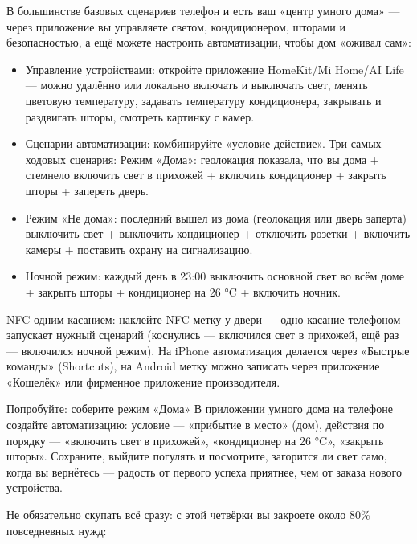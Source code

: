 
В большинстве базовых сценариев телефон и есть ваш «центр умного дома» — через приложение вы управляете светом, кондиционером, шторами и безопасностью, а ещё можете настроить автоматизации, чтобы дом «оживал сам»:

\begin{itemize}
  \item Управление устройствами: откройте приложение HomeKit/Mi Home/AI Life — можно удалённо или локально включать и выключать свет, менять цветовую температуру, задавать температуру кондиционера, закрывать и раздвигать шторы, смотреть картинку с камер.
  \item Сценарии автоматизации: комбинируйте «условие действие». Три самых ходовых сценария: Режим «Дома»: геолокация показала, что вы дома + стемнело включить свет в прихожей + включить кондиционер + закрыть шторы + запереть дверь.
  \item Режим «Не дома»: последний вышел из дома (геолокация или дверь заперта) выключить свет + выключить кондиционер + отключить розетки + включить камеры + поставить охрану на сигнализацию.
  \item Ночной режим: каждый день в 23:00 выключить основной свет во всём доме + закрыть шторы + кондиционер на 26 °C + включить ночник.
\end{itemize}

NFC одним касанием: наклейте NFC-метку у двери — одно касание телефоном запускает нужный сценарий (коснулись — включился свет в прихожей, ещё раз — включился ночной режим). На iPhone автоматизация делается через «Быстрые команды» (Shortcuts), на Android метку можно записать через приложение «Кошелёк» или фирменное приложение производителя.

\begin{tcbpractice}{Попробуйте: соберите режим «Дома»}
В приложении умного дома на телефоне создайте автоматизацию: условие — «прибытие в место» (дом), действия по порядку — «включить свет в прихожей», «кондиционер на 26 °C», «закрыть шторы». Сохраните, выйдите погулять и посмотрите, загорится ли свет само, когда вы вернётесь — радость от первого успеха приятнее, чем от заказа нового устройства.

\end{tcbpractice}


Не обязательно скупать всё сразу: с этой четвёрки вы закроете около 80\% повседневных нужд:

